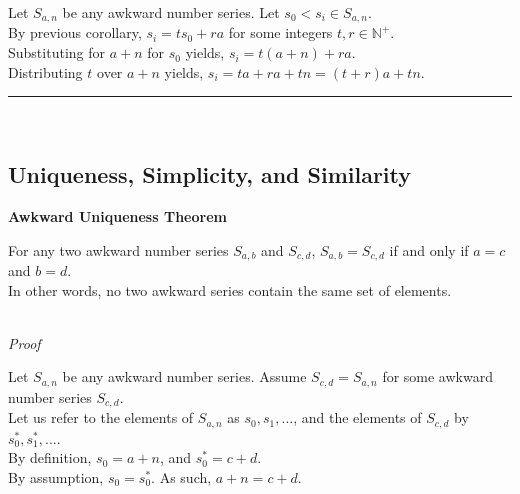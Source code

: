 \documentclass[a4paper,12pt]{article}
\begin{document}
\noindent Let $S_{a,n}$ be any awkward number series. Let $s_0 < s_i \in S_{a, n}$.\\

\noindent By previous corollary, $s_i = ts_0 + ra$ for some integers $t, r \in \mathbb{N}^+$.\\

\noindent Substituting for $a + n$ for $s_0$ yields, $s_i = t(a + n) + ra$.\\

\noindent Distributing $t$ over $a + n$ yields, $s_i = ta + ra + tn = (t + r)a + tn$.

\begin{center}
\noindent\rule{8cm}{0.4pt}
\end{center}
\noindent \\





\subsection{Uniqueness, Simplicity, and Similarity}



\label{theorem:awkward_uniqueness}
\hypertarget{theorem:awkward_uniqueness}{}
\begin{tcolorbox}
\textbf{Awkward Uniqueness Theorem}

\noindent For any two awkward number series $S_{a,b}$ and $S_{c,d}$, $S_{a,b} = S_{c,d}$ if and only if $a = c$ and $b = d$.\\

\noindent In other words, no two awkward series contain the same set of elements.
\end{tcolorbox}

\noindent \\
\textit{Proof}

\noindent Let $S_{a,n}$ be any awkward number series. Assume $S_{c, d} = S_{a, n}$ for some awkward number series $S_{c,d}$.\\


\noindent Let us refer to the elements of $S_{a,n}$ as $s_0, s_1, ...$, and the elements of $S_{c,d}$ by $s^*_0, s^*_1, ...$.\\

\noindent By definition, $s_0 = a + n$, and $s^*_0 = c + d$.\\

\noindent By assumption, $s_0 = s^*_0$. As such, $a + n = c + d$.\\
\end{document}
